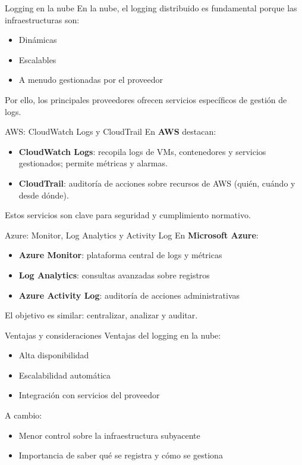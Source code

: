 \documentclass{beamer}
\begin{document}
\begin{frame}{Logging en la nube}
En la nube, el logging distribuido es fundamental porque las infraestructuras son:
\begin{itemize}
    \item Dinámicas
    \item Escalables
    \item A menudo gestionadas por el proveedor
\end{itemize}

\vspace{0.3cm}
Por ello, los principales proveedores ofrecen servicios específicos de gestión de logs.
\end{frame}

\begin{frame}{AWS: CloudWatch Logs y CloudTrail}
En \textbf{AWS} destacan:
\begin{itemize}
    \item \textbf{CloudWatch Logs}: recopila logs de VMs, contenedores y servicios gestionados;
    permite métricas y alarmas.
    \item \textbf{CloudTrail}: auditoría de acciones sobre recursos de AWS
    (quién, cuándo y desde dónde).
\end{itemize}

\vspace{0.3cm}
Estos servicios son clave para seguridad y cumplimiento normativo.
\end{frame}

\begin{frame}{Azure: Monitor, Log Analytics y Activity Log}
En \textbf{Microsoft Azure}:
\begin{itemize}
    \item \textbf{Azure Monitor}: plataforma central de logs y métricas
    \item \textbf{Log Analytics}: consultas avanzadas sobre registros
    \item \textbf{Azure Activity Log}: auditoría de acciones administrativas
\end{itemize}

\vspace{0.3cm}
El objetivo es similar: centralizar, analizar y auditar.
\end{frame}

\begin{frame}{Ventajas y consideraciones}
Ventajas del logging en la nube:
\begin{itemize}
    \item Alta disponibilidad
    \item Escalabilidad automática
    \item Integración con servicios del proveedor
\end{itemize}

\vspace{0.3cm}
A cambio:
\begin{itemize}
    \item Menor control sobre la infraestructura subyacente
    \item Importancia de saber qué se registra y cómo se gestiona
\end{itemize}
\end{frame}
\end{document}
